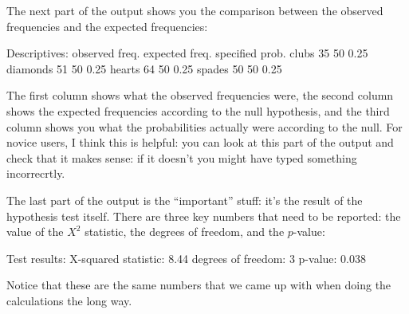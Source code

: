 The next part of the output shows you the comparison between the observed frequencies and the expected frequencies:
\begin{rblock1}
Descriptives: 
         observed freq. expected freq. specified prob.
clubs                35             50            0.25
diamonds             51             50            0.25
hearts               64             50            0.25
spades               50             50            0.25
\end{rblock1}
The first column shows what the observed frequencies were, the second column shows the expected frequencies according to the null hypothesis, and the third column shows you what the probabilities actually were according to the null. For novice users, I think this is helpful: you can look at this part of the output and check that it makes sense: if it doesn't you might have typed something incorrecrtly.

The last part of the output is the ``important'' stuff: it's the result of the hypothesis test itself. There are three key numbers that need to be reported: the value of the $X^2$ statistic, the degrees of freedom, and the $p$-value:
\begin{rblock1}
Test results: 
   X-squared statistic:  8.44 
   degrees of freedom:  3 
   p-value:  0.038 
\end{rblock1}
Notice that these are the same numbers that we came up with when doing the calculations the long way.


